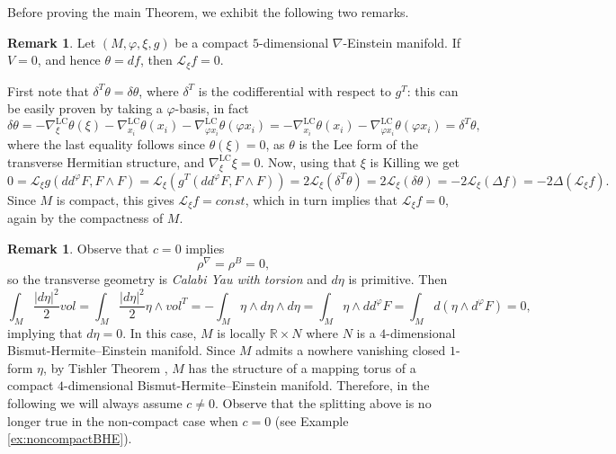 \documentclass{article}
\theoremstyle{definition}
\newtheorem{rmk}[thm]{Remark}
\newcommand{\R}{\mathbb{R}}
\renewcommand{\phi}{\varphi}
\numberwithin{equation}{section}
\begin{document}
Before proving the main Theorem, we exhibit the following two remarks.
\begin{rmk} \label{rmk:fbasic}
Let $(M,\phi,\xi,g)$ be a compact $5$-dimensional $\nabla$-Einstein manifold. If $V = 0$, and hence $\theta=df$, then $\mathcal{L}_\xi f=0$. \par
First note that $\delta^{T} \theta=\delta\theta$, where $\delta^{T}$ is the codifferential with respect to $g^T$: this can be easily proven by taking a $\phi$-basis, in fact
\[
\delta\theta=-\nabla^{\mathrm{LC}}_{\xi} \theta (\xi)- \nabla^{\mathrm{LC}}_{x_{i}}\theta (x_i)- \nabla^{\mathrm{LC}}_{\phi x_{i}}\theta (\phi x_i)=- \nabla^{\mathrm{LC}}_{x_{i}}\theta (x_i)- \nabla^{\mathrm{LC}}_{\phi x_{i}}\theta (\phi x_i)=\delta^{T}\theta,
\]
where the last equality follows since $\theta(\xi)=0$, as $\theta$ is the Lee form of the transverse Hermitian structure, and $\nabla^{\mathrm{LC}}_\xi \xi=0$. 
Now, using that $\xi$ is Killing we get
\[
0=\mathcal{L}_\xi g (dd^\phi F, F \wedge F)=\mathcal{L}_\xi (g^T (dd^\phi F, F \wedge F))=2  \mathcal{L}_\xi (\delta^T \theta)= 2 \mathcal{L}_\xi (\delta \theta)=-2 \mathcal{L}_\xi (\Delta f)=-2 \Delta (\mathcal{L}_\xi f).
\]
Since $M$ is compact, this gives $\mathcal{L}_\xi f=const$, which in turn implies that $\mathcal{L}_\xi f=0$, again by the compactness of $M$.
\end{rmk}
\begin{rmk} \label{rmk:c=0}
    Observe that $c=0$ implies
\[
\rho^\nabla=\rho^B=0,
\]
so the transverse geometry is \emph{Calabi Yau with torsion} and $d\eta$ is primitive. Then
\[
\int_{M} \frac{|d\eta|^2}{2} vol=\int_{M} \frac{|d\eta|^2}{2} \eta \wedge vol^T=-\int_{M} \eta \wedge d\eta \wedge d\eta= \int_{M} \eta \wedge dd^\phi F= \int_{M} d(\eta \wedge d^\phi F)=0,
\]
implying that $d \eta=0$. In this case, $M$ is locally $\R \times N$ where $N$ is a $4$-dimensional Bismut-Hermite--Einstein manifold. Since $M$ admits a nowhere vanishing closed $1$-form $\eta$, by Tishler Theorem \cite{Tis}, $M$ has the structure of a mapping torus of a compact $4$-dimensional Bismut-Hermite--Einstein manifold. 
Therefore, in the following we will always assume $c \neq 0$. Observe that the splitting above is no longer true in the non-compact case when $c=0$ (see Example \ref{ex:noncompactBHE}). \medskip

\end{rmk}
\end{document}
